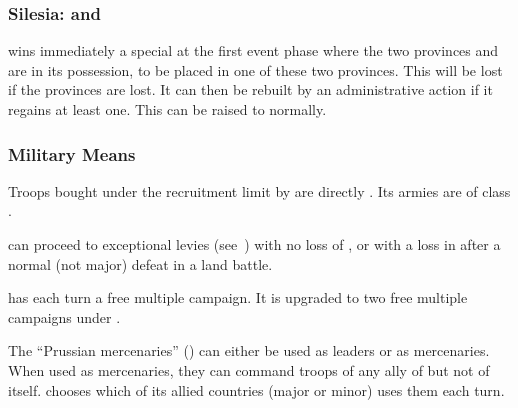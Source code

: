 \subsubsection{Silesia: 
  and }
\aparag \PRU wins immediately a special \MNU\facemoins at the first
event phase where the two provinces  and
 are in its possession, to be placed in one of these
two provinces.
\bparag This \MNU will be lost if the provinces are lost. It can then be
rebuilt by an administrative action if it regains at least one.
\bparag This \MNU can be raised to \Faceplus normally.

\subsubsection{Military Means}\label{chSpecific:Prussia:Military Means}
\aparag Troops bought under the recruitment limit by \PRU are directly
. Its armies are of class \CAIV.

\aparag \PRU can proceed to exceptional levies
(see~) with no loss of \STAB,
or with a loss in \STAB after a normal (not major) defeat in a land battle.

\aparag \PRU has each turn a free multiple campaign. It is upgraded to
two free multiple campaigns under .

 The ``Prussian mercenaries''
() can either be used as \PRU
leaders or as mercenaries.
\bparag When used as mercenaries, they can command troops of any ally
of \PRU but not of \PRU itself. \PRU chooses which of its allied
countries (major or minor) uses them each turn.

